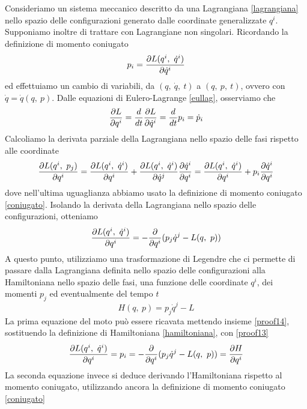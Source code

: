     Consideriamo un sistema meccanico descritto da una Lagrangiana \eqref{lagrangiana} nello spazio delle configurazioni generato dalle coordinate generalizzate $q^i$. Supponiamo inoltre di trattare con Lagrangiane non singolari. Ricordando la definizione di momento coniugato 
\begin{equation*}
    p_i = \frac{\partial L(q^i, ~\dot q^i)}{\partial\dot q^i} 
\end{equation*}
    ed effettuiamo un cambio di variabili, da $(q, ~\dot q, ~t)$ a $(q, ~p, ~t)$, ovvero con $\dot q = \dot q (q, ~ p)$. Dalle equazioni di Eulero-Lagrange \eqref{eullag}, osserviamo che 
\begin{equation} \label{proof13}
    \frac{\partial L}{\partial q^i} = \frac{d}{dt} \frac{\partial L}{\partial\dot q^i} = \frac{d}{dt} p_i = \dot p_i
\end{equation}
    Calcoliamo la derivata parziale della Lagrangiana nello spazio delle fasi rispetto alle coordinate
\begin{equation*}
    \frac{\partial L(q^i, ~p_j)}{\partial q^i} = \frac{\partial L(q^i, ~\dot q^i)}{\partial q^i} + \frac{\partial L(q^i, ~ \dot q^i)}{\partial\dot q^j} \frac{\partial\dot q^i}{\partial q^i} = \frac{\partial L(q^i, ~\dot q^i)}{\partial q^i} + p_i \frac{\partial\dot q^i}{\partial q^i} 
\end{equation*}
    dove nell'ultima uguaglianza abbiamo usato la definizione di momento coniugato \eqref{coniugato}. Isolando la derivata della Lagrangiana nello spazio delle configurazioni, otteniamo 
\begin{equation} \label{proof14}
    \frac{\partial L(q^i, ~\dot q^i)}{\partial q^i} = - \frac{\partial}{\partial q^i} (p_j \dot q^j - L(q, ~p))
\end{equation}
    A questo punto, utilizziamo una trasformazione di Legendre che ci permette di passare dalla Lagrangiana definita nello spazio delle configurazioni alla Hamiltoniana nello spazio delle fasi, una funzione delle coordinate $q^i$, dei momenti $p_j$ ed eventualmente del tempo $t$
\begin{equation} \label{hamiltoniana}
    H(q, ~p) = p_j \dot q^j - L
\end{equation} 
    La prima equazione del moto può essere ricavata mettendo insieme \eqref{proof14}, sostituendo la definizione di Hamiltoniana \eqref{hamiltoniana}, con \eqref{proof13}
\begin{equation*}
    \frac{\partial L(q^i, ~\dot q^i)}{\partial q^i} = p_i = - \frac{\partial}{\partial q^i} (p_j \dot q^j - L(q, ~p)) = \frac{\partial H}{\partial q^i}
\end{equation*}
    La seconda equazione invece si deduce derivando l'Hamiltoniana rispetto al momento coniugato, utilizzando ancora la definizione di momento coniugato \eqref{coniugato}
